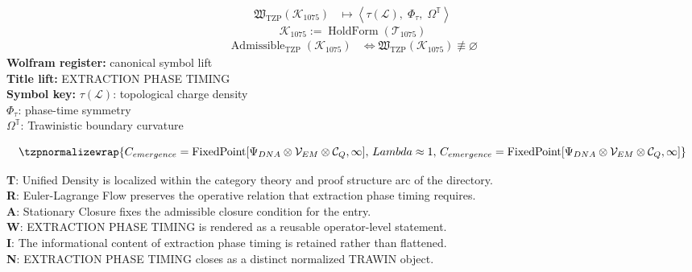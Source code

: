 \noindent
\begin{minipage}[t]{0.48\linewidth}
\begingroup
\small
\[
\begin{aligned}
\mathfrak{W}_{\mathrm{TZP}}\!\left(\mathcal{K}_{1075}\right)
&\longmapsto
\left\langle \tau(\mathcal{L}),\; \Phi_{\tau},\; \Omega^{\mathbb{T}} \right\rangle
\end{aligned}
\]
\[
\mathcal{K}_{1075}
:=
\operatorname{HoldForm}\!\left(\mathcal{T}_{1075}\right)
\]
\[
\begin{aligned}
\operatorname{Admissible}_{\mathrm{TZP}}\!\left(\mathcal{K}_{1075}\right)
&\Longleftrightarrow
\mathfrak{W}_{\mathrm{TZP}}\!\left(\mathcal{K}_{1075}\right)\not\equiv\varnothing
\end{aligned}
\]
\textbf{Wolfram register:} canonical symbol lift\\
\textbf{Title lift:} EXTRACTION PHASE TIMING\\
\textbf{Symbol key:} \(\tau(\mathcal{L})\): topological charge density\\ \(\Phi_{\tau}\): phase-time symmetry\\ \(\Omega^{\mathbb{T}}\): Trawinistic boundary curvature
\par
\endgroup
\end{minipage}\hfill
\begin{minipage}[t]{0.48\linewidth}
\[
\tzpnormalizewrap{C_{emergence} = \text{FixedPoint}[\Psi_{DNA} \otimes \mathcal{V}_{EM} \otimes \mathcal{C}_{Q}, \infty],\,Lambda \approx 1,\,C_{emergence} = \text{FixedPoint}[\Psi_{DNA} \otimes \mathcal{V}_{EM} \otimes \mathcal{C}_{Q}, \infty]}
\]

\small
\textbf{T}: Unified Density is localized within the category theory and proof structure arc of the directory.\\
\textbf{R}: Euler-Lagrange Flow preserves the operative relation that extraction phase timing requires.\\
\textbf{A}: Stationary Closure fixes the admissible closure condition for the entry.\\
\textbf{W}: EXTRACTION PHASE TIMING is rendered as a reusable operator-level statement.\\
\textbf{I}: The informational content of extraction phase timing is retained rather than flattened.\\
\textbf{N}: EXTRACTION PHASE TIMING closes as a distinct normalized TRAWIN object.
\normalsize
\end{minipage}

